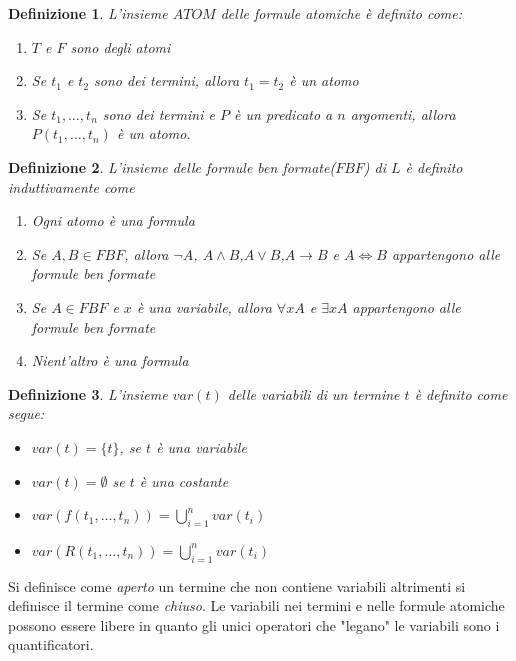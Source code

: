 \documentclass[a4paper]{report}
\newtheorem{defi}{Definizione}%
\begin{document}
\begin{defi}
    L'insieme $ATOM$ delle formule atomiche è definito come:
    \begin{enumerate}
        \item $T$ e $F$ sono degli atomi
        \item Se $t_1$ e $t_2$ sono dei termini, allora $t_1 = t_2$ è un atomo
        \item Se $t_1,\dots,t_n$ sono dei termini e $P$ è un predicato a $n$ argomenti,
              allora $P(t_1,\dots,t_n)$ è un atomo.
    \end{enumerate}
\end{defi}

\begin{defi}
    L'insieme delle formule ben formate($FBF$) di $L$ è definito induttivamente come
    \begin{enumerate}
        \item Ogni atomo è una formula
        \item Se $A,B \in FBF$, allora $\neg A$, $A \land B$,$A \lor B$,$A \rightarrow B$
              e $A \iff B$ appartengono alle formule ben formate
        \item Se $A \in FBF$ e $x$ è una variabile, allora $\forall x A$ e $\exists x A$
              appartengono alle formule ben formate
        \item Nient'altro è una formula
    \end{enumerate}
\end{defi}

\begin{defi}
    L'insieme $var(t)$ delle variabili di un termine $t$ è definito come segue:
    \begin{itemize}
        \item $var(t) = \{t \}$, se $t$ è una variabile
        \item $var(t) = \emptyset$ se $t$ è una costante
        \item $var(f(t_1,\dots,t_n)) = \bigcup _{i = 1} ^n var(t_i)$
        \item $var(R(t_1,\dots,t_n)) = \bigcup _{i = 1} ^ n var(t_i)$
    \end{itemize}
\end{defi}

Si definisce come \emph{aperto} un termine che non contiene variabili altrimenti
si definisce il termine come \emph{chiuso}.\newline
Le variabili nei termini e nelle formule atomiche possono essere libere
in quanto gli unici operatori che "legano" le variabili sono i quantificatori.
\end{document}
